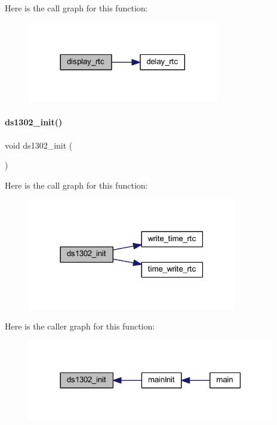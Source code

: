 Here is the call graph for this function\+:
\nopagebreak
\begin{figure}[H]
\begin{center}
\leavevmode
\includegraphics[width=236pt]{a00044_a304536cc402df7d7fc7328f36f746f16_cgraph}
\end{center}
\end{figure}
\mbox{\label{a00044_a0665eb059e742e4bb5a419144336e147}} 
\paragraph{ds1302\+\_\+init()}
{\footnotesize\ttfamily void ds1302\+\_\+init (\begin{DoxyParamCaption}{ }\end{DoxyParamCaption})}

Here is the call graph for this function\+:
\nopagebreak
\begin{figure}[H]
\begin{center}
\leavevmode
\includegraphics[width=259pt]{a00044_a0665eb059e742e4bb5a419144336e147_cgraph}
\end{center}
\end{figure}
Here is the caller graph for this function\+:
\nopagebreak
\begin{figure}[H]
\begin{center}
\leavevmode
\includegraphics[width=306pt]{a00044_a0665eb059e742e4bb5a419144336e147_icgraph}
\end{center}
\end{figure}
\mbox{\label{a00044_a628868f4036626e8fa1b055bf56dc2f1}} 
